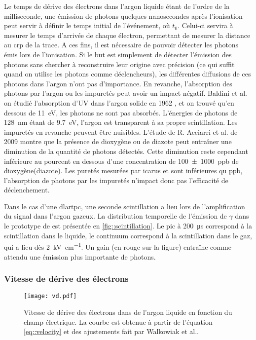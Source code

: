         Le temps de dérive des électrons dans l'argon liquide étant de l'ordre de la milliseconde, une émission de photons quelques nanosecondes après l'ionisation peut servir à définir le temps initial de l'événement, où $t_0$. Celui-ci servira à mesurer le temps d'arrivée de chaque électron, permettant de mesurer la distance au \gls{crp} de la trace. A ces fins, il est nécessaire de pouvoir détecter les photons émis lors de l'ionisation. Si le but est simplement de détecter l'émission des photons sans chercher à reconstruire leur origine avec précision (ce qui suffit quand on utilise les photons comme déclencheurs), les différentes diffusions de ces photons dans l'argon n'ont pas d'importance. En revanche, l'absorption des photons par l'argon ou les impuretés peut avoir un impact négatif. Baldini et al. on étudié l'absorption d'UV dans l'argon solide en 1962 \cite{Baldini1962}, et on trouvé qu'en dessous de \SI{11}{\eV}, les photons ne sont pas absorbés. L'énergies de photons de \SI{128}{\nano\meter} étant de \SI{9.7}{\eV}, l'argon est transparent à sa propre scintillation. Les impuretés en revanche peuvent être nuisibles. L'étude de R. Acciarri et al. de 2009\cite{Acciarri2009} montre que la présence de dioxygène ou de diazote peut entraîner une diminution de la quantité de photons détectés. Cette diminution reste cependant inférieure au pourcent en dessous d'une concentration de \SI{100(1000)}{ppb} de dioxygène(diazote). Les puretés mesurées par \gls{icarus}\cite{Antonello2014} et \protosp{} sont inférieures qu \si{ppb}, l'absorption de photons par les impuretés n'impact donc pas l'efficacité de déclenchement.

        Dans le cas d'une \gls{dlartpc}, une seconde scintillation a lieu lors de l'amplification du signal dans l'argon gazeux. La distribution temporelle de l'émission de $\gamma$ dans le prototype de \TOO{} est présentée en \autoref{fig::scintillation}. Le pic à \SI{200}{\micro\second} correspond à la scintillation dans le liquide, le continuum correspond à la scintillation dans le gaz, qui a lieu dès \SI{2}{\kilo\volt\per\centi\meter}. Un gain (en rouge sur la figure) entraîne comme attendu une émission plus importante de photons.

      \subsubsection{Vitesse de dérive des électrons}\label{sec::vitesse_derive}

        \begin{figure}[!htb]
          \centering
          \texttt{[image: vd.pdf]}
          \caption[Vitesse de dérive des électrons dans de l'argon liquide en fonction du champ électrique]{\label{fig::velocity}Vitesse de dérive des électrons dans de l'argon liquide en fonction du champ électrique. La courbe est obtenue à partir de l'équation \eqref{eq::velocity} et des ajustements fait par Walkowiak et al.\cite{Walkowiak2000}.}
        \end{figure}

